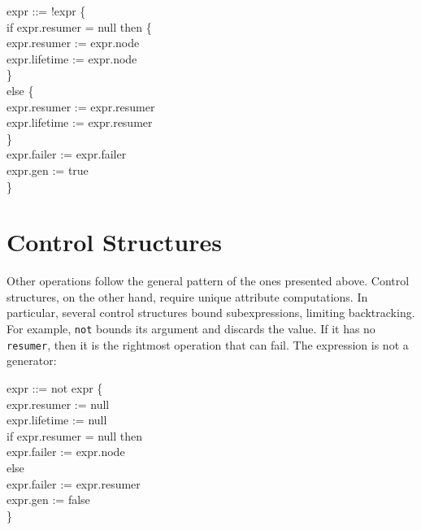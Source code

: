 \goodbreak
\begin{iconcode}
\>expr ::= !expr \{\\
\>\>\>\>if expr.resumer = null then \{\\
\>\>\>\>\>expr.resumer := expr.node\\
\>\>\>\>\>expr.lifetime := expr.node\\
\>\>\>\>\>\}\\
\>\>\>\>else \{\\
\>\>\>\>\>expr.resumer := expr.resumer\\
\>\>\>\>\>expr.lifetime := expr.resumer\\
\>\>\>\>\>\}\\
\>\>\>\>expr.failer := expr.failer\\
\>\>\>\>expr.gen := true\\
\>\>\>\>\}\\
\end{iconcode}


\section{Control Structures}

Other operations follow the general pattern of the ones presented
above. Control structures, on the other hand, require unique attribute
computations. In particular, several control structures bound
subexpressions, limiting backtracking.  For example, \texttt{not}
bounds its argument and discards the value. If it has no
\texttt{resumer}, then it is the rightmost operation that can
fail. The expression is not a generator:

\goodbreak
\begin{iconcode}
\>expr ::= not expr \{\\
\>\>\>\>expr.resumer := null\\
\>\>\>\>expr.lifetime := null\\
\>\>\>\>if expr.resumer = null then\\
\>\>\>\>\>expr.failer := expr.node\\
\>\>\>\>else\\
\>\>\>\>\>expr.failer := expr.resumer\\
\>\>\>\>expr.gen := false\\
\>\>\>\>\}\\
\end{iconcode}


